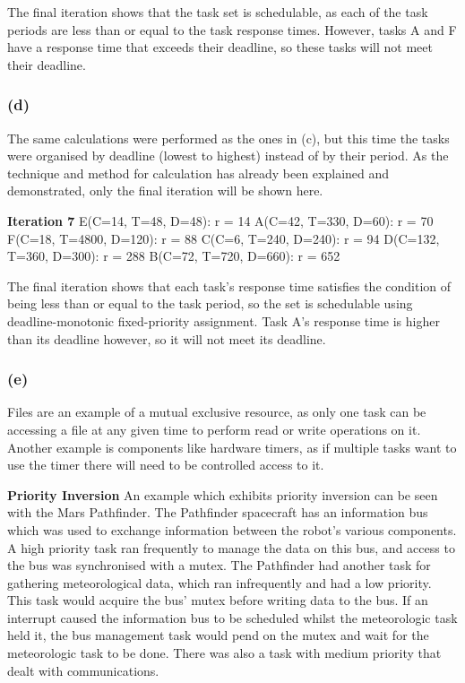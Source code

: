 \documentclass[]{report}
\begin{document}
			The final iteration shows that the task set is schedulable, as each of the task periods are less than or equal to the task response times. However, tasks A and F have a response time that exceeds their deadline, so these tasks will not meet their deadline.
			
			\subsubsection{(d)}
			The same calculations were performed as the ones in (c), but this time the tasks were organised by deadline (lowest to highest) instead of by their period. As the technique and method for calculation has already been explained and demonstrated, only the final iteration will be shown here.
			\medskip

			\textbf{Iteration 7} \newline
			E(C=14, T=48, D=48): r = 14 \newline
			A(C=42, T=330, D=60): r = 70 \newline
			F(C=18, T=4800, D=120): r = 88 \newline
			C(C=6, T=240, D=240): r = 94 \newline
			D(C=132, T=360, D=300): r = 288 \newline
			B(C=72, T=720, D=660): r = 652 \newline
		
			The final iteration shows that each task's response time satisfies the condition of being less than or equal to the task period, so the set is schedulable using deadline-monotonic fixed-priority assignment. Task A's response time is higher than its deadline however, so it will not meet its deadline.
			
			\subsubsection{(e)}
			Files are an example of a mutual exclusive resource, as only one task can be accessing a file at any given time to perform read or write operations on it. Another example is components like hardware timers, as if multiple tasks want to use the timer there will need to be controlled access to it. 
			\medskip

			\textbf{Priority Inversion}\newline
			An example which exhibits priority inversion can be seen with the Mars Pathfinder. The Pathfinder spacecraft has an information bus which was used to exchange information between the robot's various components. A high priority task ran frequently to manage the data on this bus, and access to the bus was synchronised with a mutex. The Pathfinder had another task for gathering meteorological data, which ran infrequently and had a low priority.  This task would acquire the bus' mutex before writing data to the bus. If an interrupt caused the information bus to be scheduled whilst the meteorologic task held it, the bus management task would pend on the mutex and wait for the meteorologic task to be done.  There was also a task with medium priority that dealt with communications. 
			
\end{document}
